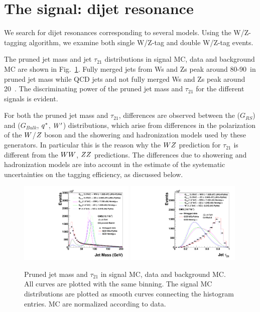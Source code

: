 \section{The signal: dijet resonance}
\label{sec:signal}

We search for dijet resonances corresponding to several models.
Using the W/Z-tagging algorithm, we examine both single W/Z-tag and double W/Z-tag events.

The pruned jet mass and jet $\tau_{21}$ distributions in signal MC, data and background MC are shown in Fig.~\ref{fig:taggingvariables}.
Fully merged jets from Ws and Zs peak around 80-90~\GeVcc in pruned jet mass while QCD jets and not fully merged Ws and Zs peak around 20~\GeVcc.
The discriminating power of the pruned jet mass and $\tau_{21}$ for the different signals is evident.

For both the pruned jet mass and $\tau_{21}$, differences are observed
between the \HERWIG{++} ($G_{RS}$) and 
($G_{Bulk}$, $q^*$, $W'$) distributions, which arise from
differences in the polarization of the $W$/$Z$ boson and the
showering and hadronization models used by these generators. In
particular this is the reason why the $WZ$ prediction for
$\tau_{21}$ is different from the $WW$, $ZZ$ predictions.
The differences due to showering and hadronization models
are into account in the estimate of the systematic uncertainties
on the tagging efficiency, as discussed below.

\begin{figure}[htb]
\begin{center}
\includegraphics[width=0.49\textwidth]{EXO-12-024/figs/signal-acc-eff/signal-data-qcd-jetmass.pdf}
\includegraphics[width=0.49\textwidth]{EXO-12-024/figs/signal-acc-eff/signal-data-qcd-Jet-Tau21.pdf}
\end{center}
\caption{Pruned jet mass and $\tau_{21}$ in signal MC, data and background MC.
All curves are plotted with the same binning.
The signal MC distributions are plotted as smooth curves connecting the histogram entries. MC are normalized according to data.
}
\label{fig:taggingvariables}
\end{figure}

